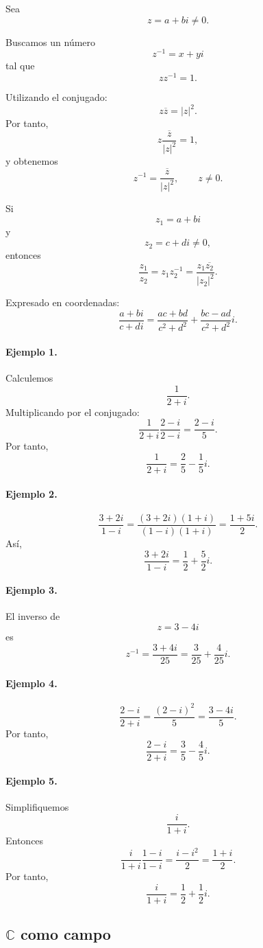 Sea
\[
z=a+bi\neq0.
\]

Buscamos un número
\[
z^{-1}=x+yi
\]
tal que
\[
zz^{-1}=1.
\]

Utilizando el conjugado:
\[
z\overline z=|z|^2.
\]
Por tanto,
\[
z\frac{\overline z}{|z|^2}=1,
\]
y obtenemos
\[
\boxed{
z^{-1}
=
\frac{\overline z}{|z|^2},
\qquad z\neq0.
}
\]

Si
\[
z_1=a+bi
\]
y
\[
z_2=c+di\neq0,
\]
entonces
\[
\frac{z_1}{z_2}
=
z_1z_2^{-1}
=
\frac{z_1\overline{z_2}}{|z_2|^2}.
\]

Expresado en coordenadas:
\[
\boxed{
\frac{a+bi}{c+di}
=
\frac{ac+bd}{c^2+d^2}
+
\frac{bc-ad}{c^2+d^2}i.
}
\]

\paragraph{Ejemplo 1.}
Calculemos
\[
\frac{1}{2+i}.
\]
Multiplicando por el conjugado:
\[
\frac{1}{2+i}
\frac{2-i}{2-i}
=
\frac{2-i}{5}.
\]
Por tanto,
\[
\boxed{
\frac{1}{2+i}
=
\frac25-\frac15 i.
}
\]

\paragraph{Ejemplo 2.}
\[
\frac{3+2i}{1-i}
=
\frac{(3+2i)(1+i)}{(1-i)(1+i)}
=
\frac{1+5i}{2}.
\]
Así,
\[
\boxed{
\frac{3+2i}{1-i}
=
\frac12+\frac52 i.
}
\]

\paragraph{Ejemplo 3.}
El inverso de
\[
z=3-4i
\]
es
\[
z^{-1}
=
\frac{3+4i}{25}
=
\boxed{
\frac3{25}+\frac4{25}i
}.
\]

\paragraph{Ejemplo 4.}
\[
\frac{2-i}{2+i}
=
\frac{(2-i)^2}{5}
=
\frac{3-4i}{5}.
\]
Por tanto,
\[
\boxed{
\frac{2-i}{2+i}
=
\frac35-\frac45 i.
}
\]

\paragraph{Ejemplo 5.}
Simplifiquemos
\[
\frac{i}{1+i}.
\]
Entonces
\[
\frac{i}{1+i}
\frac{1-i}{1-i}
=
\frac{i-i^2}{2}
=
\frac{1+i}{2}.
\]
Por tanto,
\[
\boxed{
\frac{i}{1+i}
=
\frac12+\frac12 i.
}
\]

\subsection{$\mathbb{C}$ como campo}

